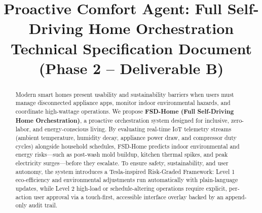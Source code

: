 \documentclass[conference]{IEEEtran}
\begin{document}
\title{Proactive Comfort Agent: Full Self-Driving Home Orchestration\\
\large Technical Specification Document (Phase 2 -- Deliverable B)}

\author{
\and
{}
\and
{}
\and
{}
}

\maketitle

\begin{abstract}
Modern smart homes present usability and sustainability barriers when users must manage disconnected appliance apps, monitor indoor environmental hazards, and coordinate high-wattage operations. We propose \textbf{FSD-Home (Full Self-Driving Home Orchestration)}, a proactive orchestration system designed for inclusive, zero-labor, and energy-conscious living. By evaluating real-time IoT telemetry streams (ambient temperature, humidity decay, appliance power draw, and compressor duty cycles) alongside household schedules, FSD-Home predicts indoor environmental and energy risks---such as post-wash mold buildup, kitchen thermal spikes, and peak electricity surges---before they escalate. To ensure safety, sustainability, and user autonomy, the system introduces a Tesla-inspired Risk-Graded Framework: Level 1 eco-efficiency and environmental adjustments run automatically with plain-language updates, while Level 2 high-load or schedule-altering operations require explicit, per-action user approval via a touch-first, accessible interface overlay backed by an append-only audit trail.
\end{abstract}
\end{document}
